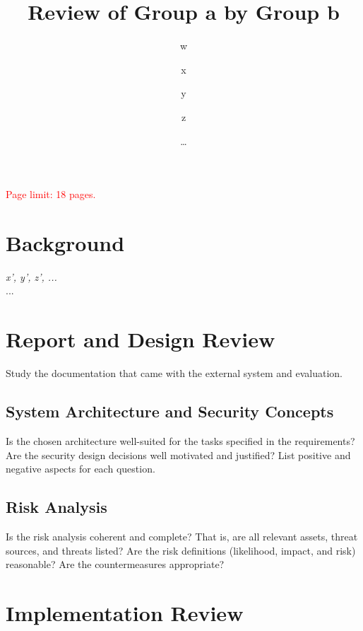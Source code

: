 \documentclass[english]{article}
\title{\huge\sffamily\bfseries Review of Group a by Group b}
\author{ w \and x \and y \and z}
\date{\dots}
\begin{document}
\maketitle

\begin{center}
{\large\textcolor{red}{Page limit: 18 pages.}}
\end{center}

\tableofcontents
\pagebreak



\section{Background}

 {\it x', y', z', ...} \\

 ...


\section{Report and Design Review}

Study the documentation that came with the external system and evaluation. 

\subsection{System Architecture and Security Concepts}

Is the chosen architecture well-suited for the tasks specified in the requirements? Are the security design decisions well motivated and justified? List positive and negative aspects for each question.


\subsection{Risk Analysis}

Is the risk analysis coherent and complete? That is, are all relevant assets, threat sources, and threats listed? 
%
Are the risk definitions (likelihood, impact, and risk) reasonable?
%
Are the countermeasures appropriate?


\section{Implementation Review}
 
\end{document}
